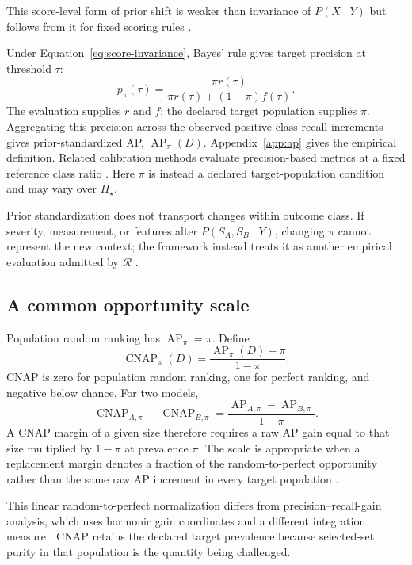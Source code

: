 \documentclass[11pt]{article}
\newcommand{\AP}{\operatorname{AP}}
\newcommand{\CNAP}{\operatorname{CNAP}}
\newcommand{\Regime}{\mathcal{R}}
\newcommand{\PSet}{\Pi_\star}
\theoremstyle{remark}
\begin{document}
This score-level form of prior shift is weaker than invariance of $P(X\mid Y)$
but follows from it for fixed scoring rules
\cite{saerens2002adjusting,storkey2009training,lipton2018detecting}.

Under Equation~\eqref{eq:score-invariance}, Bayes' rule gives target precision
at threshold $\tau$:
\begin{equation}
p_\pi(\tau)
=
\frac{\pi r(\tau)}
{\pi r(\tau)+(1-\pi)f(\tau)}.
\label{eq:reference-precision}
\end{equation}
The evaluation supplies $r$ and $f$; the declared target population supplies
$\pi$. Aggregating this precision across the observed positive-class recall
increments gives prior-standardized AP, $\AP_\pi(D)$. Appendix~\ref{app:ap}
gives the empirical definition. Related calibration methods evaluate
precision-based metrics at a fixed reference class ratio
\cite{siblini2020calibration}. Here $\pi$ is instead a declared target-population
condition and may vary over $\PSet$.

Prior standardization does not transport changes within outcome class. If
severity, measurement, or features alter $P(S_A,S_B\mid Y)$, changing $\pi$
cannot represent the new context; the framework instead treats it as another
empirical evaluation admitted by $\Regime$
\cite{bareinboim2013transportability}.

\subsection{A common opportunity scale}

Population random ranking has $\AP_\pi=\pi$. Define
\begin{equation}
\CNAP_\pi(D)
=
\frac{\AP_\pi(D)-\pi}{1-\pi}.
\label{eq:cnap}
\end{equation}
CNAP is zero for population random ranking, one for perfect ranking, and
negative below chance. For two models,
\begin{equation}
\CNAP_{A,\pi}-\CNAP_{B,\pi}
=
\frac{\AP_{A,\pi}-\AP_{B,\pi}}{1-\pi}.
\label{eq:cnap-difference}
\end{equation}
A CNAP margin of a given size therefore requires a raw AP gain equal to that
size multiplied by $1-\pi$ at prevalence $\pi$. The scale is appropriate when
a replacement margin denotes a fraction
of the random-to-perfect opportunity rather than the same raw AP increment in
every target population \cite{cohen1960coefficient}.

This linear random-to-perfect normalization differs from
precision--recall-gain analysis, which uses harmonic gain coordinates and a
different integration measure \cite{flach2015prg}. CNAP retains the declared
target prevalence because selected-set purity in that population is the
quantity being challenged.
\end{document}
